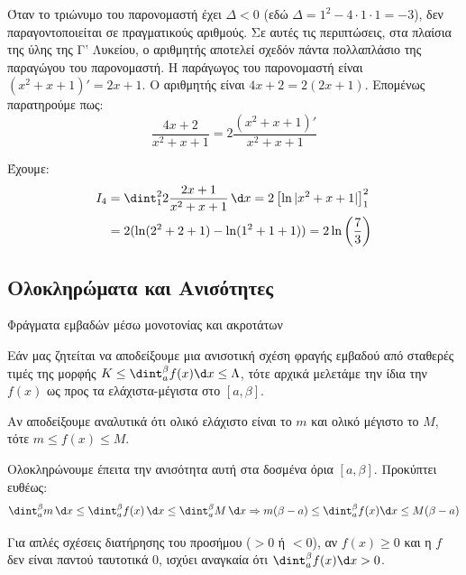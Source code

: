 \lysh
Όταν το τριώνυμο του παρονομαστή έχει $\Delta < 0$ (εδώ $\Delta = 1^2 - 4\cdot 1\cdot 1 = -3$), δεν παραγοντοποιείται σε πραγματικούς αριθμούς. Σε αυτές τις περιπτώσεις, στα πλαίσια της ύλης της Γ' Λυκείου, ο αριθμητής αποτελεί σχεδόν πάντα πολλαπλάσιο της παραγώγου του παρονομαστή. 
Η παράγωγος του παρονομαστή είναι $(x^2 + x + 1)' = 2x + 1$.
Ο αριθμητής είναι $4x + 2 = 2(2x + 1)$. Επομένως παρατηρούμε πως:
\[ \frac{4x + 2}{x^2 + x + 1} = 2 \frac{(x^2 + x + 1)'}{x^2 + x + 1} \]

Έχουμε:
\begin{align*}
I_4 &= \dint_1^2 2 \frac{2x + 1}{x^2 + x + 1} \, \d x = 2 \left[ \ln|x^2 + x + 1| \right]_1^2 \\
&= 2(\ln(2^2 + 2 + 1) - \ln(1^2 + 1 + 1)) = 2\ln\left(\frac{7}{3}\right)
\end{align*}

\subsection{Ολοκληρώματα και Ανισότητες}
\begin{askhsh}{Φράγματα εμβαδών μέσω μονοτονίας και ακροτάτων}
\bhmata
\begin{bhma}
    \item Εάν μας ζητείται να αποδείξουμε μια ανισοτική σχέση φραγής εμβαδού από σταθερές τιμές της μορφής $K \le \dint_a^\beta f(x) \d x \le \Lambda$, τότε αρχικά μελετάμε την ίδια την $f(x)$ ως προς τα ελάχιστα-μέγιστα στο $[a, \beta]$.
    \item Αν αποδείξουμε αναλυτικά ότι ολικό ελάχιστο είναι το $m$ και ολικό μέγιστο το $M$, τότε $m \le f(x) \le M$.
    \item Ολοκληρώνουμε έπειτα την ανισότητα αυτή στα δοσμένα όρια $[a, \beta]$. Προκύπτει ευθέως: \[\dint_a^\beta m \, \d x \le \dint_a^\beta f(x) \, \d x \le \dint_a^\beta M \, \d x \Rightarrow m(\beta-a) \le \dint_a^\beta f(x) \d x \le M(\beta-a)\]
    \item Για απλές σχέσεις διατήρησης του προσήμου ($>0$ ή $<0$), αν $f(x) \ge 0$ και η $f$ δεν είναι παντού ταυτοτικά $0$, ισχύει αναγκαία ότι $\dint_a^\beta f(x) \d x > 0$.
\end{bhma}
\end{askhsh}


